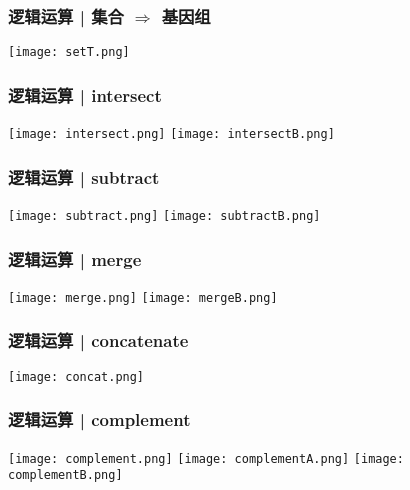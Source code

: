 \begin{frame}
	\frametitle{逻辑运算 | 集合 $\Rightarrow$ 基因组}
		\begin{center}
			\texttt{[image: setT.png]}
		\end{center}
\end{frame}


\begin{frame}
	\frametitle{逻辑运算 | intersect}
		\begin{center}
			\texttt{[image: intersect.png]}
			\vspace{0.1cm}
			\texttt{[image: intersectB.png]}
		\end{center}
\end{frame}

\begin{frame}
	\frametitle{逻辑运算 | subtract}
		\begin{center}
			\texttt{[image: subtract.png]}
			\vspace{0.1cm}
			\texttt{[image: subtractB.png]}
		\end{center}
\end{frame}

\begin{frame}
	\frametitle{逻辑运算 | merge}
		\begin{center}
			\texttt{[image: merge.png]}
			\vspace{0.5cm}
			\texttt{[image: mergeB.png]}
		\end{center}
\end{frame}

\begin{frame}
	\frametitle{逻辑运算 | concatenate}
		\begin{center}
			\texttt{[image: concat.png]}
		\end{center}
\end{frame}

\begin{frame}
	\frametitle{逻辑运算 | complement}
		\begin{center}
			\texttt{[image: complement.png]}
			\vspace{0.1cm}
			\texttt{[image: complementA.png]}
			\vspace{0.1cm}
			\texttt{[image: complementB.png]}
		\end{center}
\end{frame}

